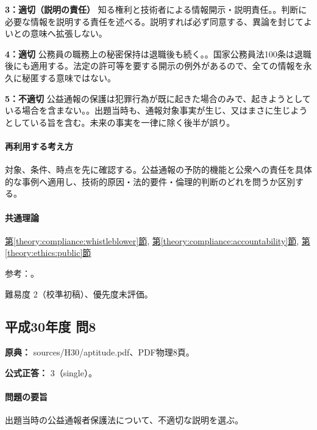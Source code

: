 \noindent\textbf{3：適切（説明の責任）} 知る権利と技術者による情報開示・説明責任。。判断に必要な情報を説明する責任を述べる。説明すれば必ず同意する、異論を封じてよいとの意味へ拡張しない。\par

\noindent\textbf{4：適切} 公務員の職務上の秘密保持は退職後も続く。。国家公務員法100条は退職後にも適用する。法定の許可等を要する開示の例外があるので、全ての情報を永久に秘匿する意味ではない。\par

\noindent\textbf{5：不適切} 公益通報の保護は犯罪行為が既に起きた場合のみで、起きようとしている場合を含まない。。出題当時も、通報対象事実が生じ、又はまさに生じようとしている旨を含む。未来の事実を一律に除く後半が誤り。\par

\paragraph{再利用する考え方} 対象、条件、時点を先に確認する。公益通報の予防的機能と公衆への責任を具体的な事例へ適用し、技術的原因・法的要件・倫理的判断のどれを問うか区別する。

\paragraph{共通理論} \hyperref[theory:compliance:whistleblower]{第\ref*{theory:compliance:whistleblower}節}, \hyperref[theory:compliance:accountability]{第\ref*{theory:compliance:accountability}節}, \hyperref[theory:ethics:public]{第\ref*{theory:ethics:public}節}

\par 参考：\cite{caa_handbook_pre2022,caa_report_current,jp_constitution,jp_civil,jp_national_public}。

\par 難易度 2（校準初稿）、優先度未評価。

\subsection{平成30年度 問8}
\label{q:h30-reg-apt-08}

\noindent\textbf{原典：} sources/H30/aptitude.pdf、PDF物理8頁。

\textbf{公式正答：} 3（single）。

\paragraph{問題の要旨} 出題当時の公益通報者保護法について、不適切な説明を選ぶ。

